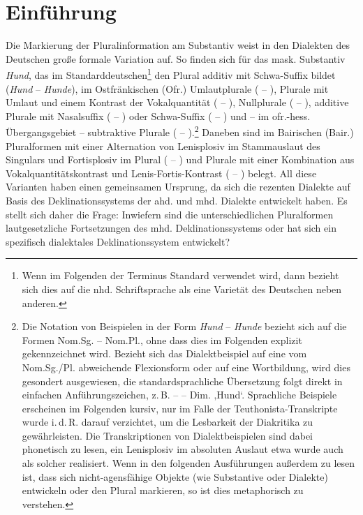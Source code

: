 \chapter{Einführung}
\label{chap:1}
Die Markierung der Pluralinformation am Substantiv weist in den Dialekten des Deutschen große formale Variation auf. So finden sich für das mask. Substantiv \textit{Hund}, das im Standarddeutschen\footnote{Wenn im Folgenden der Terminus Standard verwendet wird, dann bezieht sich dies auf die nhd. Schriftsprache als eine Varietät des Deutschen neben anderen.} den Plural additiv mit Schwa-Suffix bildet (\textit{Hund} -- \textit{Hunde}), im Ostfränkischen (Ofr.) Umlautplurale ( -- ), Plurale mit Umlaut und einem Kontrast der Vokalquantität ( -- ), Nullplurale ( -- ), additive Plurale mit Nasalsuffix ( -- ) oder Schwa-Suffix ( -- ) und -- im ofr.-hess. Übergangsgebiet -- subtraktive Plurale ( -- ).\footnote{Die Notation von Beispielen in der Form \textit{Hund} -- \textit{Hunde} bezieht sich auf die Formen Nom.Sg. -- Nom.Pl., ohne dass dies im Folgenden explizit gekennzeichnet wird. Bezieht sich das Dialektbeispiel auf eine vom Nom.Sg./Pl. abweichende Flexionsform oder auf eine Wortbildung, wird dies gesondert ausgewiesen, die standardsprachliche Übersetzung folgt direkt in einfachen Anführungszeichen, z.\,B.  --  -- Dim.  ‚Hund‘. Sprachliche Beispiele erscheinen im Folgenden kursiv, nur im Falle der Teuthonista-Transkripte wurde i.\,d.\,R. darauf verzichtet, um die Lesbarkeit der Diakritika zu gewährleisten. Die Transkriptionen von Dialektbeispielen sind dabei phonetisch zu lesen, ein Lenisplosiv im absoluten Auslaut etwa wurde auch als solcher realisiert. Wenn in den folgenden Ausführungen außerdem zu lesen ist, dass sich nicht-agensfähige Objekte (wie Substantive oder Dialekte) entwickeln oder den Plural markieren, so ist dies metaphorisch zu verstehen.} Daneben sind im Bairischen (Bair.) Pluralformen mit einer Alternation von Lenisplosiv im Stammauslaut des Singulars und Fortisplosiv im Plural ( -- ) und Plurale mit einer Kombination aus Vokalquantitätskontrast und Lenis-Fortis-Kontrast ( -- ) belegt. All diese Varianten haben einen gemeinsamen Ursprung, da sich die rezenten Dialekte auf Basis des Deklinationssystems der ahd. und mhd. Dialekte entwickelt haben. Es stellt sich daher die Frage: Inwiefern sind die unterschiedlichen Pluralformen lautgesetzliche Fortsetzungen des mhd. Deklinationssystems oder hat sich ein spezifisch dialektales Deklinationssystem entwickelt?

